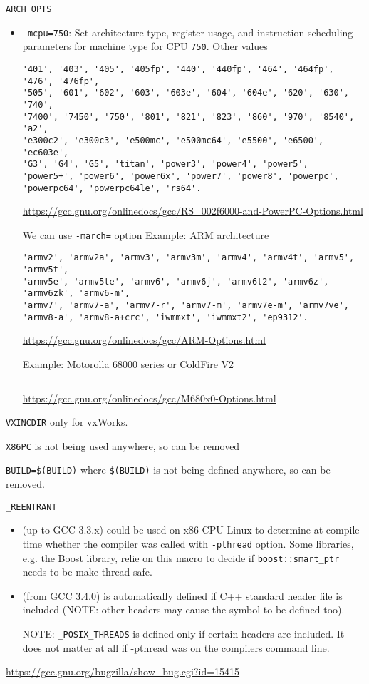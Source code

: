 \verb!ARCH_OPTS! 
\begin{itemize}
  \item \verb!-mcpu=750!: Set architecture type, register usage, and instruction
  scheduling parameters for machine type for CPU \verb!750!. Other values
\begin{verbatim}
'401', '403', '405', '405fp', '440', '440fp', '464', '464fp', '476', '476fp',
'505', '601', '602', '603', '603e', '604', '604e', '620', '630', '740', 
'7400', '7450', '750', '801', '821', '823', '860', '970', '8540', 'a2', 
'e300c2', 'e300c3', 'e500mc', 'e500mc64', 'e5500', 'e6500', 'ec603e', 
'G3', 'G4', 'G5', 'titan', 'power3', 'power4', 'power5', 
'power5+', 'power6', 'power6x', 'power7', 'power8', 'powerpc', 'powerpc64', 'powerpc64le', 'rs64'.
\end{verbatim}
  \url{https://gcc.gnu.org/onlinedocs/gcc/RS_002f6000-and-PowerPC-Options.html}
  
 We can use \verb!-march=! option
 Example: ARM architecture
\begin{verbatim}
'armv2', 'armv2a', 'armv3', 'armv3m', 'armv4', 'armv4t', 'armv5', 'armv5t',
'armv5e', 'armv5te', 'armv6', 'armv6j', 'armv6t2', 'armv6z', 'armv6zk', 'armv6-m', 
'armv7', 'armv7-a', 'armv7-r', 'armv7-m', 'armv7e-m', 'armv7ve', 
'armv8-a', 'armv8-a+crc', 'iwmmxt', 'iwmmxt2', 'ep9312'.
\end{verbatim}
 
 \url{https://gcc.gnu.org/onlinedocs/gcc/ARM-Options.html}
 
 
 Example: Motorolla 68000 series or ColdFire V2
\begin{verbatim}

\end{verbatim}
\url{https://gcc.gnu.org/onlinedocs/gcc/M680x0-Options.html}
\end{itemize}

\verb!VXINCDIR! only for vxWorks.


\verb!X86PC! is not being used anywhere, so can be removed

\verb!BUILD=$(BUILD)! where \verb!$(BUILD)! is not being defined anywhere, so
can be removed.

\verb!_REENTRANT! 
\begin{itemize}
  \item  (up to GCC 3.3.x) could be used on x86 CPU Linux to determine
at compile time whether the compiler was called with \verb!-pthread! option.
Some libraries, e.g. the Boost library, relie on this macro to decide if
\verb!boost::smart_ptr! needs to be make thread-safe.

  \item (from GCC 3.4.0) is automatically defined if C++ standard header file is
  included (NOTE: other headers may cause the symbol to be defined too).
  
NOTE: \verb!_POSIX_THREADS! is defined only if certain headers are included.
It does not matter at all if -pthread was on the compilers command line.

 
\end{itemize}
\url{https://gcc.gnu.org/bugzilla/show_bug.cgi?id=15415}

